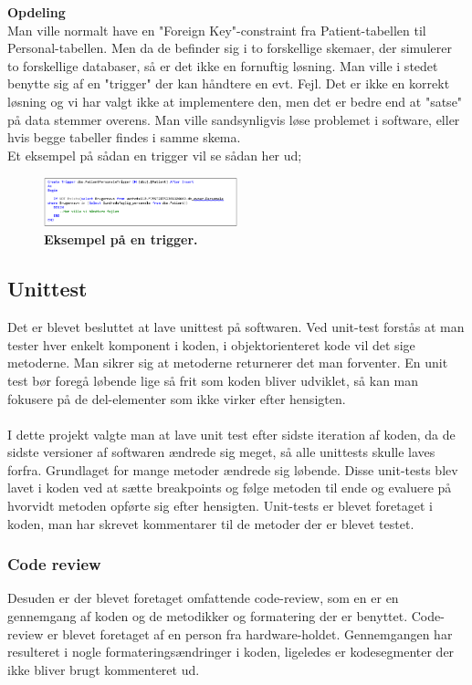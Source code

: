 \textbf{Opdeling}\\
Man ville normalt have en "Foreign Key"-constraint fra Patient-tabellen til Personal-tabellen. Men da de befinder sig i to forskellige skemaer, der simulerer to forskellige databaser, så er det ikke en fornuftig løsning. Man ville i stedet benytte sig af en "trigger" der kan håndtere en evt. Fejl. Det er ikke en korrekt løsning og vi har valgt ikke at implementere den, men det er bedre end at "satse" på data stemmer overens. Man ville sandsynligvis løse problemet i software, eller hvis begge tabeller findes i samme skema. \\
Et eksempel på sådan en trigger vil se sådan her ud;
\begin{figure}[H]
\includegraphics[width =0.5\textwidth , center]{billeder/database_kode}
\caption{\textbf{Eksempel på en trigger.}}
\end{figure}
\subsection{Unittest}
Det er blevet besluttet at lave unittest på softwaren. Ved unit-test forstås at man tester hver enkelt komponent i koden, i objektorienteret kode vil det sige metoderne. Man sikrer sig at metoderne returnerer det man forventer. En unit test bør foregå løbende lige så frit som koden bliver udviklet, så kan man fokusere på de del-elementer som ikke virker efter hensigten. \\\\
I dette projekt valgte man at lave unit test efter sidste iteration af koden, da de sidste versioner af softwaren ændrede sig meget, så alle unittests skulle laves forfra. Grundlaget for mange metoder ændrede sig løbende. Disse unit-tests blev lavet i koden ved at sætte breakpoints og følge metoden til ende og evaluere på hvorvidt metoden opførte sig efter hensigten. Unit-tests er blevet foretaget i koden, man har skrevet kommentarer til de metoder der er blevet testet.
\subsubsection{Code review}
Desuden er der blevet foretaget omfattende code-review, som en er en gennemgang af koden og de metodikker og formatering der er benyttet. Code-review er blevet foretaget af en person fra hardware-holdet. Gennemgangen har resulteret i nogle formateringsændringer i koden, ligeledes er kodesegmenter der ikke bliver brugt kommenteret ud.
